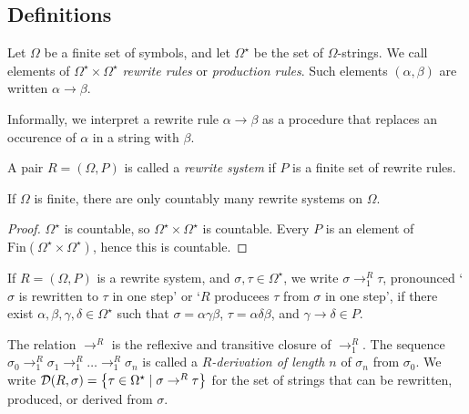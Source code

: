 \subsection{Definitions}
\begin{definition}
	Let \( \Omega \) be a finite set of symbols, and let \( \Omega^\star \) be the set of \( \Omega \)-strings.
	We call elements of \( \Omega^\star \times \Omega^\star \) \emph{rewrite rules} or \emph{production rules}.
	Such elements \( (\alpha, \beta) \) are written \( \alpha \to \beta \).
\end{definition}
Informally, we interpret a rewrite rule \( \alpha \to \beta \) as a procedure that replaces an occurence of \( \alpha \) in a string with \( \beta \).
\begin{definition}
	A pair \( R = (\Omega, P) \) is called a \emph{rewrite system} if \( P \) is a finite set of rewrite rules.
\end{definition}
\begin{proposition}
	If \( \Omega \) is finite, there are only countably many rewrite systems on \( \Omega \).
\end{proposition}
\begin{proof}
	\( \Omega^\star \) is countable, so \( \Omega^\star \times \Omega^\star \) is countable.
	Every \( P \) is an element of \( \mathrm{Fin}(\Omega^\star \times \Omega^\star) \), hence this is countable.
\end{proof}
\begin{definition}
	If \( R = (\Omega, P) \) is a rewrite system, and \( \sigma, \tau \in \Omega^\star \), we write \( \sigma \to^R_1 \tau \), pronounced `\( \sigma \) is rewritten to \( \tau \) in one step' or `\( R \) producees \( \tau \) from \( \sigma \) in one step', if there exist \( \alpha, \beta, \gamma, \delta \in \Omega^\star \) such that \( \sigma = \alpha \gamma \beta \), \( \tau = \alpha \delta \beta \), and \( \gamma \to \delta \in P \).

	The relation \( \to^R \) is the reflexive and transitive closure of \( \to^R_1 \).
	The sequence \( \sigma_0 \to^R_1 \sigma_1 \to^R_1 \dots \to^R_1 \sigma_n \) is called a \emph{\( R \)-derivation of length \( n \)} of \( \sigma_n \) from \( \sigma_0 \).
	We write \( \mathcal D(R, \sigma) = \qty{\tau \in \Omega^\star \mid \sigma \to^R \tau} \) for the set of strings that can be rewritten, produced, or derived from \( \sigma \).
\end{definition}

